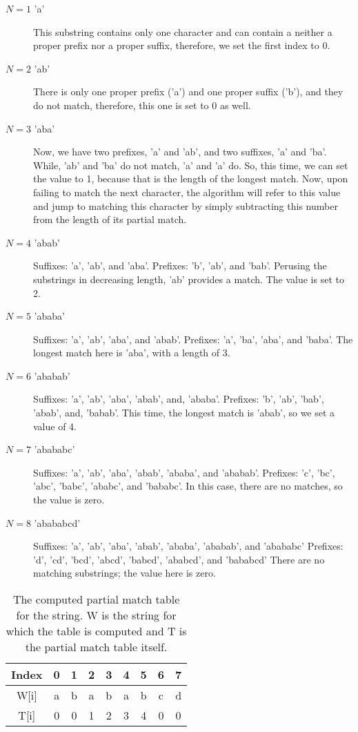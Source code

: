 \begin{description}
\item[$N = 1$ 'a']
This substring contains only one character and can contain a neither a proper prefix nor a proper suffix, therefore, we set the first index to 0.

\item[$N = 2$ 'ab']
There is only one proper prefix ('a') and one proper suffix ('b'), and they do not match, therefore, this one is set to 0 as well.

\item[$N = 3$ 'aba']
Now, we have two prefixes, 'a' and 'ab', and two suffixes, 'a' and 'ba'.
While, 'ab' and 'ba' do not match, 'a' and 'a' do.
So, this time, we can set the value to 1, because that is the length of the longest match.
Now, upon failing to match the next character, the algorithm will refer to this value and jump to matching this character by simply subtracting this number from the length of its partial match.

\item[$N = 4$ 'abab']
Suffixes: 'a', 'ab', and 'aba'.
Prefixes: 'b', 'ab', and 'bab'.
Perusing the substrings in decreasing length, 'ab' provides a match. The value is set to 2.

\item[$N = 5$ 'ababa']
Suffixes: 'a', 'ab', 'aba', and 'abab'.
Prefixes: 'a', 'ba', 'aba', and 'baba'.
The longest match here is 'aba', with a length of 3.

\item[$N = 6$ 'ababab']
Suffixes: 'a', 'ab', 'aba', 'abab', and, 'ababa'.
Prefixes: 'b', 'ab', 'bab', 'abab', and, 'babab'.
This time, the longest match is 'abab', so we set a value of 4.

\item[$N = 7$ 'abababc']
Suffixes: 'a', 'ab', 'aba', 'abab', 'ababa', and 'ababab'.
Prefixes: 'c', 'bc', 'abc', 'babc', 'ababc', and 'bababc'.
In this case, there are no matches, so the value is zero.

\item[$N = 8$ 'abababcd']
Suffixes: 'a', 'ab', 'aba', 'abab', 'ababa', 'ababab', and 'abababc'
Prefixes: 'd', 'cd', 'bcd', 'abcd', 'babcd', 'ababcd', and 'bababcd'
There are no matching substrings; the value here is zero.
\end{description}

\begin{table}[h]
	\begin{center}
		\begin{tabular}{ | c | c | c | c | c | c | c | c | c | }
			\hline
			Index & 0 & 1 & 2 & 3 & 4 & 5 & 6 & 7 \\ \hline
			W[i]  & a & b & a & b & a & b & c & d \\ \hline
			T[i]  & 0 & 0 & 1 & 2 & 3 & 4 & 0 & 0 \\ \hline
		\end{tabular}
		\caption{The computed partial match table for the string.
		W is the string for which the table is computed and T is the partial match table itself.}
	\end{center}
\end{table}


